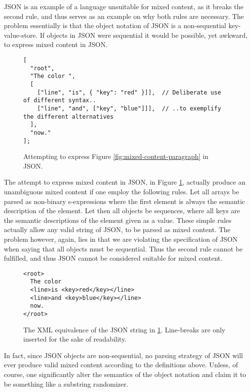 \documentclass{scrreprt}
\begin{document}
JSON is an example of a language unsuitable for mixed content, as it breaks the second rule, and thus serves as an example on why both rules are necessary. The problem essentially is that the object notation of JSON is a non-sequential key-value-store. If objects in JSON were sequential it would be possible, yet awkward, to express mixed content in JSON.

\begin{figure}[h]
\begin{lstlisting}
[
  "root",
  "The color ",
  [
    ["line", "is", { "key": "red" }]],  // Deliberate use of different syntax..
    ["line", "and", ["key", "blue"]]],  // ..to exemplify the different alternatives
  ],
  "now."
];
\end{lstlisting}
\caption{Attempting to express Figure \ref{fig:mixed-content-paragraph} in JSON.}
\label{fig:mixed-content-json}
\end{figure}

The attempt to express mixed content in JSON, in Figure \ref{fig:mixed-content-json}, actually produce an unambiguous mixed content if one employ the following rules. Let all arrays be parsed as non-binary s-expressions where the first element is always the semantic description of the element. Let then all objects be sequences, where all keys are the semantic descriptions of the element given as a value. These simple rules actually allow any valid string of JSON, to be parsed as mixed content. The problem however, again, lies in that we are violating the specification of JSON when saying that all objects must be sequential. Thus the second rule cannot be fulfilled, and thus JSON cannot be considered suitable for mixed content.

\begin{figure}[h]
\begin{lstlisting}
<root>
  The color
  <line>is <key>red</key></line>
  <line>and <key>blue</key></line>
  now.
</root>
\end{lstlisting}
\caption{The XML equivalence of the JSON string in \ref{fig:mixed-content-json}. Line-breaks are only inserted for the sake of readability.}
\label{fig:json-mixed-content-xml-equivalence}
\end{figure}

In fact, since JSON objects are non-sequential, no parsing strategy of JSON will ever produce valid mixed content according to the definitions above. Unless, of course, one significantly alter the semantics of the object notation and claim it to be something like a substring randomizer.
\end{document}
